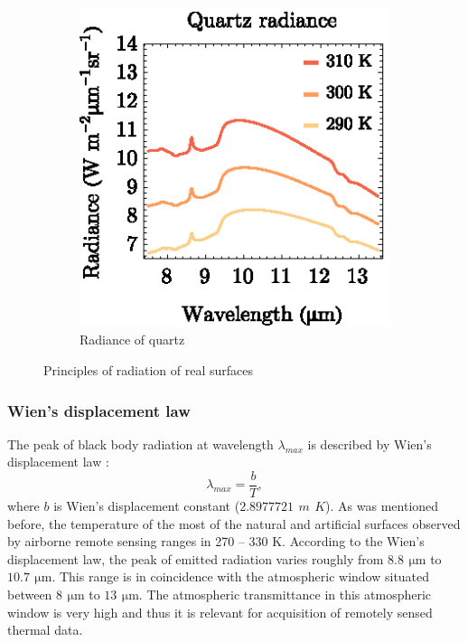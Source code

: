 \begin{figure}[htb]
\begin{subfigure}[t]{.3\linewidth}
	\end{subfigure}
	\hspace{1em}
	\begin{subfigure}[t]{.3\linewidth}
		\centering
		\includegraphics[scale=1]{pics/Chapter_01/QuartzRadiance.eps}
		\vspace{-0.1cm}
		\caption{Radiance of quartz}
		\label{fig:QuartzRadiance}
	\end{subfigure}
	\vspace{1.5 em}
	\caption{Principles of radiation of real surfaces}
\end{figure}


\subsubsection*{Wien's displacement law}
The peak of black body radiation at wavelength $\lambda_{max}$ is described by Wien's displacement law \cite{H11}:
$$ \lambda_{max} = \frac{b}{T},$$
where $b$ is Wien's displacement constant ($2.8977721\,\SI{}{m}\,\SI{}{K}$). As was mentioned before, the temperature of the most of the natural and artificial surfaces observed by airborne remote sensing ranges in 270 – 330 K. According to the Wien's displacement law, the peak of emitted radiation varies roughly from $8.8\,\SI{}{\micro\meter}$ to $10.7\,\SI{}{\micro\meter}$. This range is in coincidence with the atmospheric window situated between $8\,\SI{}{\micro\meter}$ to $13\,\SI{}{\micro\meter}$. The atmospheric transmittance in this atmospheric window is very high and thus it is relevant for acquisition of remotely sensed thermal data.

